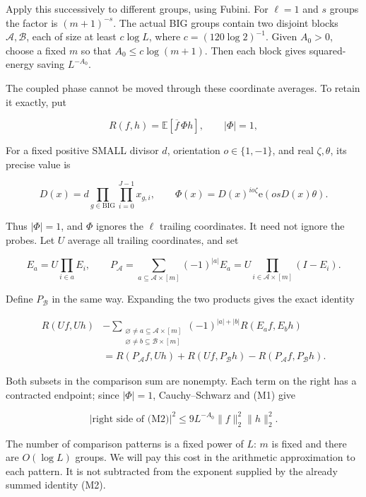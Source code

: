 Apply this successively to different groups, using Fubini. For
\(\ell=1\) and \(s\) groups the factor is \((m+1)^{-s}\). The actual BIG
groups contain two disjoint blocks \(\mathcal A,\mathcal B\), each of
size at least \(c\log L\), where \(c=(120\log2)^{-1}\). Given \(A_0>0\),
choose a fixed \(m\) so that \(A_0\le c\log(m+1)\). Then each block
gives squared-energy saving \(L^{-A_0}\).

The coupled phase cannot be moved through these coordinate averages. To
retain it exactly, put

\[
R(f,h)=\mathbb E[\overline f\,\Phi h],\qquad |\Phi|=1,
\]

For a fixed positive SMALL divisor \(d\), orientation \(o\in\{1,-1\}\),
and real \(\zeta,\theta\), its precise value is

\[
D(x)=d\prod_{g\in\mathrm{BIG}}\prod_{i=0}^{J-1}x_{g,i},
\qquad
\Phi(x)=D(x)^{io\zeta}\mathrm e(o sD(x)\theta).
\tag{M0a}
\]

Thus \(|\Phi|=1\), and \(\Phi\) ignores the \(\ell\) trailing
coordinates. It need not ignore the probes. Let \(U\) average all
trailing coordinates, and set

\[
E_a=U\prod_{i\in a}E_i,
\qquad P_{\mathcal A}=\sum_{a\subseteq\mathcal A\times[m]}
 (-1)^{|a|}E_a
 =U\prod_{i\in\mathcal A\times[m]}(I-E_i).
\]

Define \(P_{\mathcal B}\) in the same way. Expanding the two products
gives the exact identity

\[
\begin{aligned}
R(Uf,Uh)&-
\sum_{\substack{\varnothing\ne a\subseteq\mathcal A\times[m]\\
                 \varnothing\ne b\subseteq\mathcal B\times[m]}}
 (-1)^{|a|+|b|}R(E_af,E_bh)\\
&=R(P_{\mathcal A}f,Uh)+R(Uf,P_{\mathcal B}h)
  -R(P_{\mathcal A}f,P_{\mathcal B}h).
\end{aligned} \tag{M2}
\]

Both subsets in the comparison sum are nonempty. Each term on the right
has a contracted endpoint; since \(|\Phi|=1\), Cauchy--Schwarz and (M1)
give

\[
|\text{right side of (M2)}|^2
 \le9L^{-A_0}\|f\|_2^2\|h\|_2^2. \tag{M3}
\]

The number of comparison patterns is a fixed power of \(L\): \(m\) is
fixed and there are \(O(\log L)\) groups. We will pay this cost in the
arithmetic approximation to each pattern. It is not subtracted from the
exponent supplied by the already summed identity (M2).

